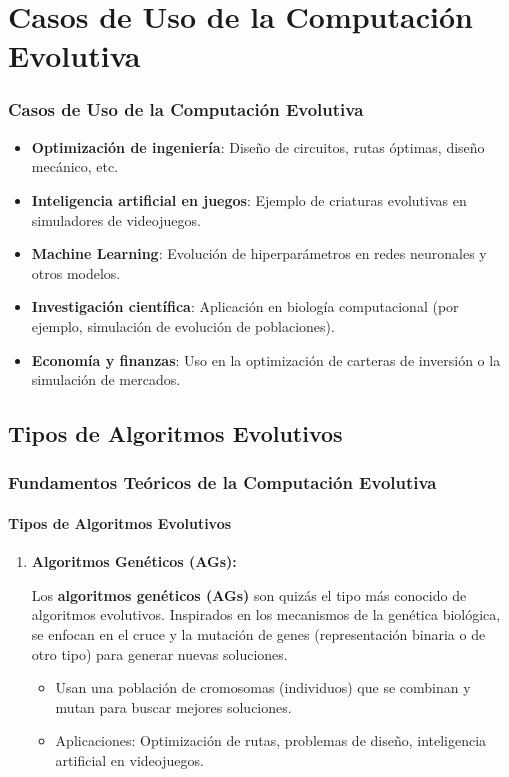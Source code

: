 \documentclass[
	11pt, %
]{beamer}
\begin{document}
\section{Casos de Uso de la Computación Evolutiva}
\begin{frame}
    \frametitle{Casos de Uso de la Computación Evolutiva}
    \begin{itemize}
        \item \textbf{Optimización de ingeniería}: Diseño de circuitos, rutas óptimas, diseño mecánico, etc.
        \item \textbf{Inteligencia artificial en juegos}: Ejemplo de criaturas evolutivas en simuladores de videojuegos.
        \item \textbf{Machine Learning}: Evolución de hiperparámetros en redes neuronales y otros modelos.
        \item \textbf{Investigación científica}: Aplicación en biología computacional (por ejemplo, simulación de evolución de poblaciones).
        \item \textbf{Economía y finanzas}: Uso en la optimización de carteras de inversión o la simulación de mercados.
    \end{itemize}
    
\end{frame}
\subsection{Tipos de Algoritmos Evolutivos}
\begin{frame}
	\frametitle{Fundamentos Teóricos de la Computación Evolutiva}
	\framesubtitle{Tipos de Algoritmos Evolutivos}
	\begin{enumerate}
		\item \textbf{Algoritmos Genéticos (AGs):}
		
		Los \textbf{algoritmos genéticos (AGs)} son quizás el tipo más conocido de algoritmos evolutivos. Inspirados en los mecanismos de la genética biológica, se enfocan en el cruce y la mutación de genes (representación binaria o de otro tipo) para generar nuevas soluciones.
		
		\begin{itemize}
			\item Usan una población de cromosomas (individuos) que se combinan y mutan para buscar mejores soluciones.
			\item Aplicaciones: Optimización de rutas, problemas de diseño, inteligencia artificial en videojuegos.
		\end{itemize}
	\end{enumerate}
\end{frame}
\end{document}
